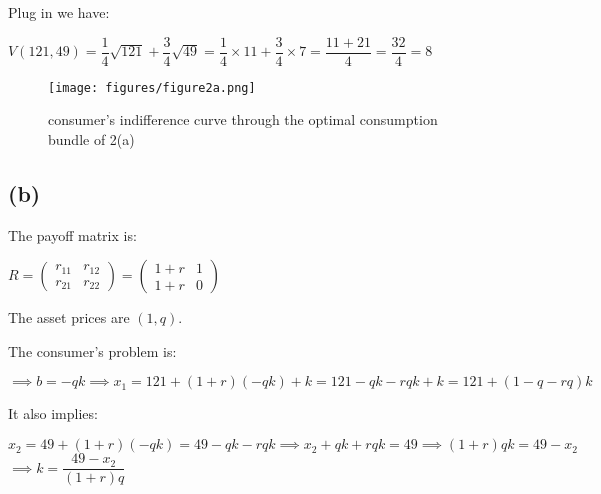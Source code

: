 \documentclass{article}
\begin{document}
Plug in we have:

$\boxed{V(121, 49)=\dfrac{1}{4}\sqrt{121}+\dfrac{3}{4}\sqrt{49}=\dfrac{1}{4}\times11+\dfrac{3}{4}\times7=\dfrac{11+21}{4}=\dfrac{32}{4}=\boxed{8}}$

\begin{figure}[H]
    \begin{center}
        \texttt{[image: figures/figure2a.png]}
    \end{center}
    \caption{consumer's indifference curve through the optimal consumption bundle of 2(a)}
    \label{fig:graph}
\end{figure}

\subsection*{(b)}

The payoff matrix is:

$R=\begin{pmatrix}
    r_{11} & r_{12} \\
    r_{21} & r_{22}
\end{pmatrix}=\begin{pmatrix}
    1+r & 1 \\
    1+r & 0
\end{pmatrix}$

The asset prices are $(1,q)$.

The consumer's problem is:


$\implies b=-qk\implies x_{1}=121+\left(1+r\right)\left(-qk\right)+k=121-qk-rqk+k=121+\left(1-q-rq\right)k$

It also implies:

$x_{2}=49+\left(1+r\right)\left(-qk\right)=49-qk-rqk\implies x_{2}+qk+rqk=49\implies \left(1+r\right)qk=49-x_{2}$\\
$\implies k=\dfrac{49-x_{2}}{\left(1+r\right)q}$
\end{document}
